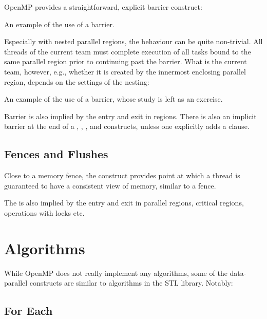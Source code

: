 OpenMP provides a straightforward, explicit barrier construct:

\raggedbottom
\begin{codebox}[]{\href{https://godbolt.org/z/qK53jYonK}{\ExternalLink}}
\footnotesize An example of the use of a barrier.
\tcblower
{}
\end{codebox}

Especially with nested parallel regions, the behaviour can be quite non-trivial.
All threads of the current team must complete execution of all tasks bound to the same parallel region prior to continuing past the barrier. What is the current team, however, e.g., whether it is created by the innermost enclosing parallel region,
depends on the settings of the nesting:

\raggedbottom
\begin{codebox}[]{\href{https://godbolt.org/z/eb7n975ea}{\ExternalLink}}
\footnotesize An example of the use of a barrier, whose study is left as an exercise.
\tcblower
{}
\end{codebox}

Barrier is also implied by the entry and exit in  regions.
There is also an implicit barrier at the end of a , , , and  constructs, unless one explicitly adds a  clause.

\subsection{Fences and Flushes}

Close to a memory fence, the  construct provides point at which a thread is guaranteed to
have a consistent view of memory, similar to a fence. 

The  is also implied by the entry and exit in parallel regions, critical regions, operations with locks etc. 


\section{Algorithms}

While OpenMP does not really implement any algorithms, some of the data-parallel constructs are similar to algorithms in the STL library. Notably:

\subsection{For Each}

